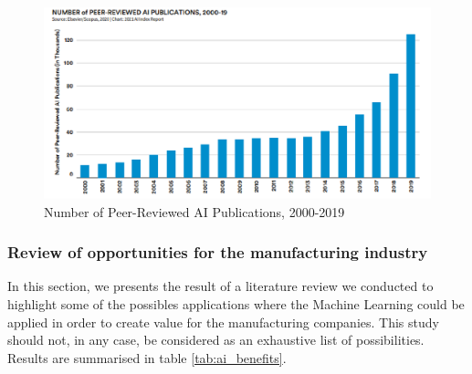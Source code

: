 \begin{figure}
\centerline{\includegraphics[scale=0.9]{images/chapter_1/AI_report.eps}}
\caption{Number of Peer-Reviewed AI Publications, 2000-2019 \citep{zhang2021ai}}
\label{fig:Number of Peer-Reviewed AI Publications}
\end{figure}


\subsubsection{Review of opportunities for the manufacturing industry}

In this section, we presents the result of a literature review we conducted to highlight some of the possibles applications where the Machine Learning could be applied in order to create value for the manufacturing companies. This study should not, in any case, be considered as an exhaustive list of possibilities. Results are summarised in table \ref{tab:ai_benefits}. 

